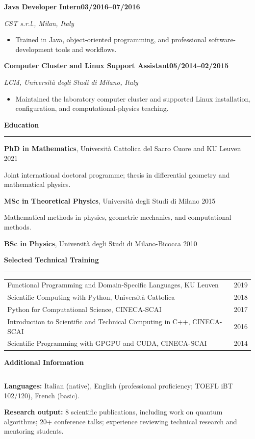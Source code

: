 \documentclass[11pt,a4paper]{article}
\newcommand{\cvsection}[1]{%
  \vspace{0.85em}%
  {\large\bfseries\color{accent} #1}\par
  \vspace{0.18em}\hrule\vspace{0.45em}%
}
\newcommand{\role}[4]{%
  \Needspace{6\baselineskip}%
  \textbf{#1}\hfill\textbf{#2}\par
  \textit{#3}\par
  \begin{itemize}#4\end{itemize}
  \vspace{0.3em}%
}
\begin{document}
\role{Java Developer Intern}{03/2016--07/2016}{CST s.r.l., Milan, Italy}{
  \item Trained in Java, object-oriented programming, and professional software-development tools and workflows.
}

\role{Computer Cluster and Linux Support Assistant}{05/2014--02/2015}{LCM, Universit\`a degli Studi di Milano, Italy}{
  \item Maintained the laboratory computer cluster and supported Linux installation, configuration, and computational-physics teaching.
}

\cvsection{Education}

\textbf{PhD in Mathematics}, Universit\`a Cattolica del Sacro Cuore and KU Leuven \hfill 2021\par
Joint international doctoral programme; thesis in differential geometry and mathematical physics.\par\vspace{0.25em}

\textbf{MSc in Theoretical Physics}, Universit\`a degli Studi di Milano \hfill 2015\par
Mathematical methods in physics, geometric mechanics, and computational methods.\par\vspace{0.25em}

\textbf{BSc in Physics}, Universit\`a degli Studi di Milano-Bicocca \hfill 2010

\cvsection{Selected Technical Training}

\begin{tabularx}{\textwidth}{@{}Xr@{}}
Functional Programming and Domain-Specific Languages, KU Leuven & 2019 \\
Scientific Computing with Python, Universit\`a Cattolica & 2018 \\
Python for Computational Science, CINECA-SCAI & 2017 \\
Introduction to Scientific and Technical Computing in C++, CINECA-SCAI & 2016 \\
Scientific Programming with GPGPU and CUDA, CINECA-SCAI & 2014
\end{tabularx}

\cvsection{Additional Information}

\textbf{Languages:} Italian (native), English (professional proficiency; TOEFL iBT 102/120), French (basic).\par
\textbf{Research output:} 8 scientific publications, including work on quantum algorithms; 20+ conference talks; experience reviewing technical research and mentoring students.
\end{document}
